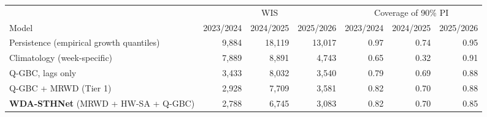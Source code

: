 \begin{tabular}{lrrrrrr}
\toprule
 & \multicolumn{3}{c}{WIS} & \multicolumn{3}{c}{Coverage of 90\% PI} \\
\cmidrule(lr){2-4}\cmidrule(lr){5-7}
Model & 2023/2024 & 2024/2025 & 2025/2026 & 2023/2024 & 2024/2025 & 2025/2026 \\
\midrule
Persistence (empirical growth quantiles) & 9,884 & 18,119 & 13,017 & 0.97 & 0.74 & 0.95 \\
Climatology (week-specific) & 7,889 & 8,891 & 4,743 & 0.65 & 0.32 & 0.91 \\
Q-GBC, lags only & 3,433 & 8,032 & 3,540 & 0.79 & 0.69 & 0.88 \\
Q-GBC + MRWD (Tier 1) & 2,928 & 7,709 & 3,581 & 0.82 & 0.70 & 0.88 \\
\textbf{WDA-STHNet} (MRWD + HW-SA + Q-GBC) & 2,788 & 6,745 & 3,083 & 0.82 & 0.70 & 0.85 \\
\bottomrule
\end{tabular}
